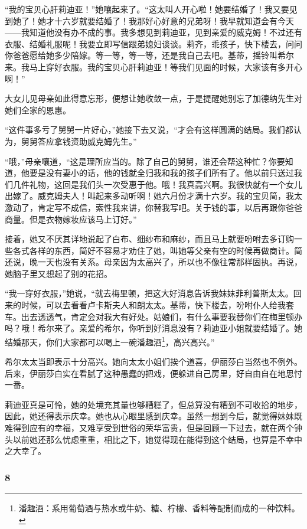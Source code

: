 \par “我的宝贝心肝莉迪亚！”她嚷起来了。“这太叫人开心啦！她要结婚了！我又要见到她了！她才十六岁就要结婚了！我那好心好意的兄弟呀！我早就知道会有今天——我知道他没有办不成的事。我多想见到莉迪亚，见到亲爱的威克姆！不过还有衣服、结婚礼服呢！我要立即写信跟弟媳妇谈谈。莉齐，乖孩子，快下楼去，问问你爸爸愿给她多少陪嫁。等一等，等一等，还是我自己去吧。基蒂，摇铃叫希尔来。我马上穿好衣服。我的宝贝心肝莉迪亚！等我们见面的时候，大家该有多开心啊！”
\par 大女儿见母亲如此得意忘形，便想让她收敛一点，于是提醒她别忘了加德纳先生对她们全家的恩惠。
\par “这件事多亏了舅舅一片好心，”她接下去又说，“才会有这样圆满的结局。我们都认为，舅舅答应拿钱资助威克姆先生。”
\par “哦，”母亲嚷道，“这是理所应当的。除了自己的舅舅，谁还会帮这种忙？你要知道，他要是没有妻小的话，他的钱就全归我和我的孩子们所有了。他以前只送过我们几件礼物，这回是我们头一次受惠于他。哦！我真高兴啊。我很快就有一个女儿出嫁了。威克姆夫人！叫起来多动听啊！她六月份才满十六岁。我的宝贝简，我太激动了，肯定写不成信，索性我来讲，你替我写吧。关于钱的事，以后再跟你爸爸商量。但是衣物嫁妆应该马上订好。”
\par 接着，她又不厌其详地说起了白布、细纱布和麻纱，而且马上就要吩咐去多订购一些各式各样的东西，简好不容易才劝住了她，叫她等父亲有空的时候再做商计。简还说，晚一天也没有关系。母亲因为太高兴了，所以也不像往常那样固执。再说，她脑子里又想起了别的花招。
\par “我一穿好衣服，”她说，“就去梅里顿，把这大好消息告诉我妹妹菲利普斯太太。回来的时候，可以去看看卢卡斯夫人和朗太太。基蒂，快下楼去，吩咐仆人给我套车。出去透透气，肯定会对我大有好处。姑娘们，有什么事要我替你们在梅里顿办吗？哦！希尔来了。亲爱的希尔，你听到好消息没有？莉迪亚小姐就要结婚了。她结婚那天，你们大家都可以喝上一碗潘趣酒\footnote{潘趣酒：系用葡萄酒与热水或牛奶、糖、柠檬、香料等配制而成的一种饮料。}，高兴高兴。”
\par 希尔太太当即表示十分高兴。她向太太小姐们挨个道喜，伊丽莎白当然也不例外。后来，伊丽莎白实在看腻了这种愚蠢的把戏，便躲进自己房里，好自由自在地思忖一番。
\par 莉迪亚真是可怜，她的处境充其量也够糟糕了，但总算没有糟到不可收拾的地步，因此，她还得表示庆幸。她也从心眼里感到庆幸。虽然一想到今后，就觉得妹妹既难得到应有的幸福，又难享受到世俗的荣华富贵，但是回顾一下过去，就在两个钟头以前她还那么忧虑重重，相比之下，她觉得现在能得到这个结局，也算是不幸中之大幸了。




\subsubsection*{8}


